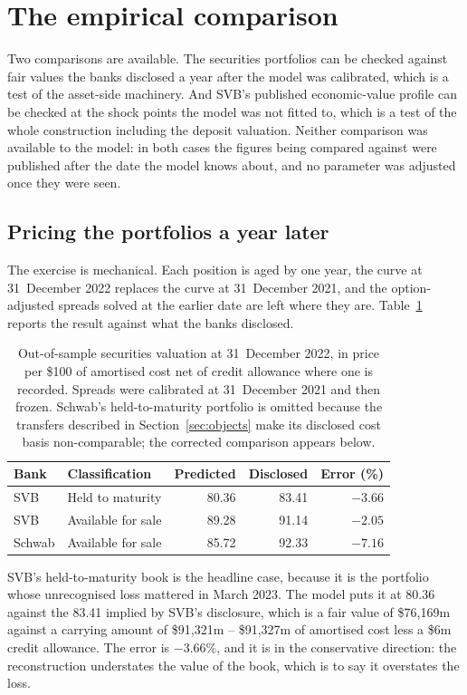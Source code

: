 \section{The empirical comparison}
\label{sec:comparison}

Two comparisons are available. The securities portfolios can be checked against fair
values the banks disclosed a year after the model was calibrated, which is a test of
the asset-side machinery. And SVB's published economic-value profile can be checked
at the shock points the model was not fitted to, which is a test of the whole
construction including the deposit valuation. Neither comparison was available to
the model: in both cases the figures being compared against were published after the
date the model knows about, and no parameter was adjusted once they were seen.

\subsection{Pricing the portfolios a year later}

The exercise is mechanical. Each position is aged by one year, the curve at
31~December 2022 replaces the curve at 31~December 2021, and the option-adjusted
spreads solved at the earlier date are left where they are.
Table~\ref{tab:oos} reports the result against what the banks disclosed.

\begin{table}[htbp]
\centering
\caption{Out-of-sample securities valuation at 31~December 2022, in price per \$100
of amortised cost net of credit allowance where one is recorded. Spreads were
calibrated at 31~December 2021 and then frozen.
Schwab's held-to-maturity portfolio is omitted because the transfers described in
Section~\ref{sec:objects} make its disclosed cost basis non-comparable; the corrected
comparison appears below.}
\label{tab:oos}
\small
\begin{tabular}{llrrr}
\toprule
Bank & Classification & Predicted & Disclosed & Error (\%) \\
\midrule
SVB    & Held to maturity   & 80.36 & 83.41 & $-3.66$ \\
SVB    & Available for sale & 89.28 & 91.14 & $-2.05$ \\
Schwab & Available for sale & 85.72 & 92.33 & $-7.16$ \\
\bottomrule
\end{tabular}
\end{table}

SVB's held-to-maturity book is the headline case, because it is the portfolio whose
unrecognised loss mattered in March 2023. The model puts it at 80.36 against the
83.41 implied by SVB's disclosure, which is a fair value of \$76,169m against a
carrying amount of \$91,321m -- \$91,327m of amortised cost less a \$6m credit
allowance. The error is $-3.66\%$, and it is in the conservative direction: the
reconstruction understates the value of the book, which is to say it overstates the
loss.

